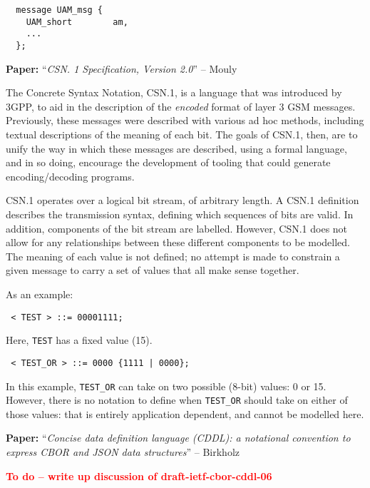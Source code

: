 \documentclass[10pt,a4paper]{article}
\newcommand{\todo}[1]{\textbf{\textcolor{red}{To do -- #1}}}
\newcommand{\paper}[3]{\vspace{4mm}\noindent\textbf{Paper:} ``\textit{#1}'' -- #2 \cite{#3}\vspace{3mm}}
\begin{document}
\begin{verbatim}
  message UAM_msg {
    UAM_short        am,
    ...
  };
\end{verbatim}

\paper{CSN. 1 Specification, Version 2.0}{Mouly}{mouly1998csn}

The Concrete Syntax Notation, CSN.1, is a language that was introduced by 3GPP, to aid in
the description of the \emph{encoded} format of layer 3 GSM messages. Previously, these
messages were described with various ad hoc methods, including textual descriptions of the
meaning of each bit. The goals of CSN.1, then, are to unify the way in which these
messages are described, using a formal language, and in so doing, encourage the
development of tooling that could generate encoding/decoding programs.

CSN.1 operates over a logical bit stream, of arbitrary length. A CSN.1 definition
describes the transmission syntax, defining which sequences of bits are valid. In
addition, components of the bit stream are labelled. However, CSN.1 does not allow for any
relationships between these different components to be modelled. The meaning of each value
is not defined; no attempt is made to constrain a given message to carry a set of values
that all make sense together.

As an example:

\begin{verbatim} < TEST > ::= 00001111; \end{verbatim}

Here, \texttt{TEST} has a fixed value (15).

\begin{verbatim} < TEST_OR > ::= 0000 {1111 | 0000}; \end{verbatim}

In this example, \texttt{TEST\_OR} can take on two possible (8-bit) values: 0 or 15.
However, there is no notation to define when \texttt{TEST\_OR} should take on either of
those values: that is entirely application dependent, and cannot be modelled here.

\paper{Concise data definition language (CDDL): a notational convention to
       express CBOR and JSON data structures}{Birkholz}{draft-ietf-cbor-cddl-06}

\todo{write up discussion of draft-ietf-cbor-cddl-06}
\end{document}
